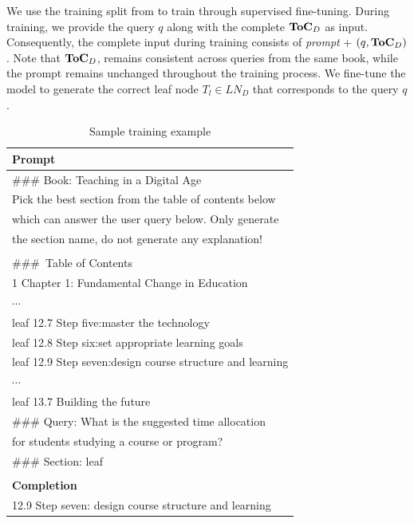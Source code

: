 
We use the training split from {\ben} to train {\sys} through supervised fine-tuning. During training, we provide the query $q$ along with the complete ${\textbf{{ToC}}}_{D}$ as input. Consequently, the complete input during training consists of \textit{prompt} + $(q,{\textbf{{ToC}}}_{D})$. Note that ${\textbf{{ToC}}}_{D}$, remains consistent across queries from the same book, while the prompt remains unchanged throughout the training process. We fine-tune the model to generate the correct leaf node $T_{l}\in LN_{D}$ that corresponds to the query $q$.

\begin{table}[!htb]
\small
\caption{Sample training example}
\label{table:train_example_small}
\begin{tabular}{l}
\textbf{Prompt} \\
\toprule
\#\#\# Book: Teaching in a Digital Age\\
Pick the best section from the table of contents below\\
which can answer the user query below. Only generate \\
the section name, do not generate any explanation!\\
\\
\#\#\#\ Table of Contents\\
1 Chapter 1: Fundamental Change in Education \\
$\cdots$ \\
leaf 12.7 Step five:master the technology \\
leaf 12.8 Step six:set appropriate learning goals \\
leaf 12.9 Step seven:design course structure and learning\\
$\cdots$ \\
leaf 13.7 Building the future \\
\#\#\# Query: What is the suggested time allocation \\ 
for students studying a course or program? \\
\#\#\# Section: leaf \\
\\
\textbf{Completion} \\
\midrule
12.9 Step seven: design course structure and learning
\end{tabular}
\end{table}